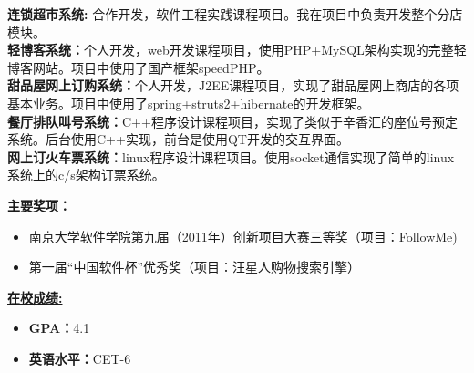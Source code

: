 \documentclass[12pt]{article}
\begin{document}
\begin{itemize}
\begin{small}
     \textbf{连锁超市系统:} 合作开发，软件工程实践课程项目。我在项目中负责开发整个分店模块。\\
     \textbf{轻博客系统：}个人开发，web开发课程项目，使用PHP+MySQL架构实现的完整轻博客网站。项目中使用了国产框架speedPHP。\\
     \textbf{甜品屋网上订购系统：}个人开发，J2EE课程项目，实现了甜品屋网上商店的各项基本业务。项目中使用了spring+struts2+hibernate的开发框架。\\
     \textbf{餐厅排队叫号系统：}C++程序设计课程项目，实现了类似于辛香汇的座位号预定系统。后台使用C++实现，前台是使用QT开发的交互界面。\\
     \textbf{网上订火车票系统：}linux程序设计课程项目。使用socket通信实现了简单的linux系统上的c/s架构订票系统。
     \end{small}
\end{itemize}

\bigskip
{\large \textbf{\underline{主要奖项：}}}
\medskip
\begin{itemize}
  \item 南京大学软件学院第九届（2011年）创新项目大赛三等奖（项目：FollowMe)
  \item 第一届“中国软件杯”优秀奖（项目：汪星人购物搜索引擎）
\end{itemize}


\bigskip
{\large \textbf{\underline{在校成绩:}}}\\
\medskip
\begin{itemize}
\item \textbf{GPA：}4.1\\
\item \textbf{英语水平：}CET-6\\
\end{itemize}
\end{document}
